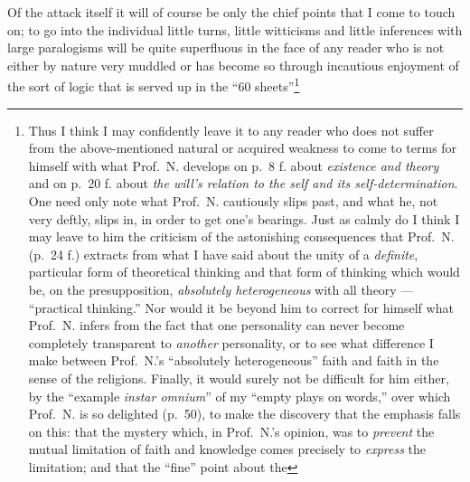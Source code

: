 \documentclass[12pt,a4paper]{book}
\begin{document}
\setcounter{footnote}{0}
Of the attack itself it will of course be only the chief points that I come to
touch on; to go into the individual little turns, little witticisms and little
inferences with large paralogisms will be quite superfluous in the face of any
reader who is not either by nature very muddled or has become so through
incautious enjoyment of the sort of logic that is served up in the ``60
sheets''\footnote{%
  Thus I think I may confidently leave it to any reader who does not suffer
  from the above-mentioned natural or acquired weakness to come to terms for
  himself with what Prof.\ N. develops on p.\ 8 f. about \emph{existence and
  theory} and on p.\ 20 f. about \emph{the will's relation to the self and its
  self-determination}. One need only note what Prof.\ N. cautiously slips past,
  and what he, not very deftly, slips in, in order to get one's bearings. Just
  as calmly do I think I may leave to him the criticism of the astonishing
  consequences that Prof.\ N. (p.\ 24 f.) extracts from what I have said about
  the unity of a \emph{definite}, particular form of theoretical thinking and
  that form of thinking which would be, on the presupposition, \emph{absolutely
  heterogeneous} with all theory --- ``practical thinking.''
  Nor would it be beyond him to correct for himself what Prof.\ N. infers from
  the fact that one personality can never become completely transparent to
  \emph{another} personality, or to see what difference I make between Prof.\
  N.'s ``absolutely heterogeneous'' faith and faith in the sense of the
  religions. Finally, it would surely not be difficult for him either, by the
  ``example \textit{instar omnium}'' of my ``empty plays on words,'' over which
  Prof.\ N. is so delighted (p.\ 50), to make the discovery that the emphasis
  falls on this: that the mystery which, in Prof.\ N.'s opinion, was to
  \emph{prevent} the mutual limitation of faith and knowledge comes precisely
  to \emph{express} the limitation; and that the ``fine'' point about the
}
\end{document}
